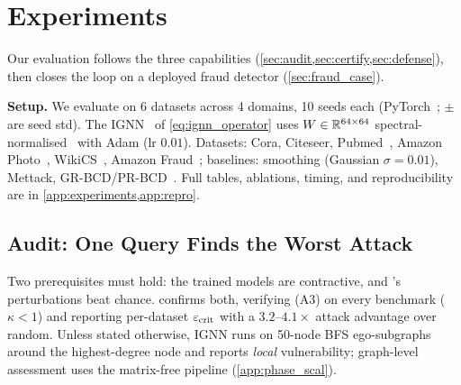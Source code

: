 \section{Experiments}
\label{sec:experiments}

Our evaluation follows the three capabilities (\cref{sec:audit,sec:certify,sec:defense}), then closes the loop on a deployed fraud detector (\cref{sec:fraud_case}).

\textbf{Setup.} We evaluate \AEGIS on 6 datasets across 4 domains, 10 seeds each (PyTorch~\cite{paszke2019pytorch}; $\pm$ are seed std). The IGNN~\cite{gu2020implicit} of \cref{eq:ignn_operator} uses $W\in\mathbb{R}^{64\times64}$ spectral-normalised~\cite{miyato2018spectral} with Adam (lr $0.01$). Datasets: Cora, Citeseer, Pubmed~\cite{sen2008collective}, Amazon Photo~\cite{shchur2018pitfalls}, WikiCS~\cite{mernyei2020wiki}, Amazon Fraud~\cite{dou2020enhancing}; baselines: smoothing (Gaussian $\sigma{=}0.01$), Mettack, GR-BCD/PR-BCD~\cite{geisler2021robustness}. Full tables, ablations, timing, and reproducibility are in \cref{app:experiments,app:repro}.

\subsection{Audit: One Query Finds the Worst Attack}
\label{sec:audit}\label{sec:adaptive}\label{sec:certificates}\label{sec:cross_domain}

Two prerequisites must hold: the trained models are contractive, and \AEGIS's perturbations beat chance.  confirms both, verifying (A3) on every benchmark ($\kappa{<}1$) and reporting per-dataset $\varepsilon_{\mathrm{crit}}$ with a $3.2$--$4.1\times$ attack advantage over random. Unless stated otherwise, IGNN runs on 50-node BFS ego-subgraphs around the highest-degree node and reports \emph{local} vulnerability; graph-level assessment uses the matrix-free pipeline (\cref{app:phase_scal}).


